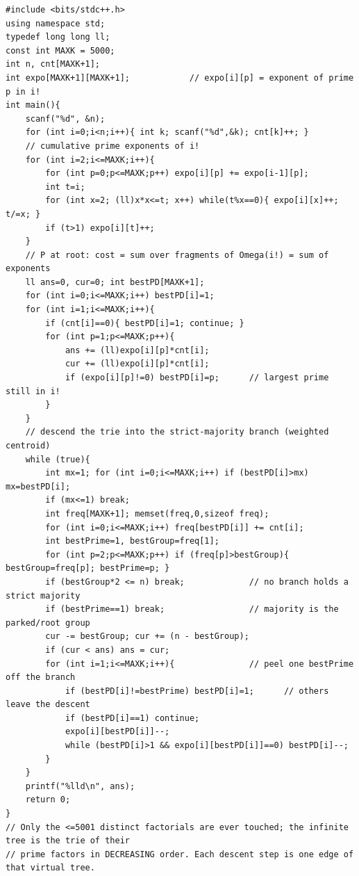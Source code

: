 \begin{lstlisting}[caption={CF 1292D Summit: collapse fragments to counts over the distinct factorials, precompute prime exponents of each factorial, then descend the decreasing-prime-factor trie into the strict-majority branch (weighted centroid) tracking the cost delta. Faithful to Akikaze's official solution. ASCII only, identifiers without underscores.}, label={lst:c30-summit}]
#include <bits/stdc++.h>
using namespace std;
typedef long long ll;
const int MAXK = 5000;
int n, cnt[MAXK+1];
int expo[MAXK+1][MAXK+1];            // expo[i][p] = exponent of prime p in i!
int main(){
    scanf("%d", &n);
    for (int i=0;i<n;i++){ int k; scanf("%d",&k); cnt[k]++; }
    // cumulative prime exponents of i!
    for (int i=2;i<=MAXK;i++){
        for (int p=0;p<=MAXK;p++) expo[i][p] += expo[i-1][p];
        int t=i;
        for (int x=2; (ll)x*x<=t; x++) while(t%x==0){ expo[i][x]++; t/=x; }
        if (t>1) expo[i][t]++;
    }
    // P at root: cost = sum over fragments of Omega(i!) = sum of exponents
    ll ans=0, cur=0; int bestPD[MAXK+1];
    for (int i=0;i<=MAXK;i++) bestPD[i]=1;
    for (int i=1;i<=MAXK;i++){
        if (cnt[i]==0){ bestPD[i]=1; continue; }
        for (int p=1;p<=MAXK;p++){
            ans += (ll)expo[i][p]*cnt[i];
            cur += (ll)expo[i][p]*cnt[i];
            if (expo[i][p]!=0) bestPD[i]=p;      // largest prime still in i!
        }
    }
    // descend the trie into the strict-majority branch (weighted centroid)
    while (true){
        int mx=1; for (int i=0;i<=MAXK;i++) if (bestPD[i]>mx) mx=bestPD[i];
        if (mx<=1) break;
        int freq[MAXK+1]; memset(freq,0,sizeof freq);
        for (int i=0;i<=MAXK;i++) freq[bestPD[i]] += cnt[i];
        int bestPrime=1, bestGroup=freq[1];
        for (int p=2;p<=MAXK;p++) if (freq[p]>bestGroup){ bestGroup=freq[p]; bestPrime=p; }
        if (bestGroup*2 <= n) break;             // no branch holds a strict majority
        if (bestPrime==1) break;                 // majority is the parked/root group
        cur -= bestGroup; cur += (n - bestGroup);
        if (cur < ans) ans = cur;
        for (int i=1;i<=MAXK;i++){               // peel one bestPrime off the branch
            if (bestPD[i]!=bestPrime) bestPD[i]=1;      // others leave the descent
            if (bestPD[i]==1) continue;
            expo[i][bestPD[i]]--;
            while (bestPD[i]>1 && expo[i][bestPD[i]]==0) bestPD[i]--;
        }
    }
    printf("%lld\n", ans);
    return 0;
}
// Only the <=5001 distinct factorials are ever touched; the infinite tree is the trie of their
// prime factors in DECREASING order. Each descent step is one edge of that virtual tree.
\end{lstlisting}


